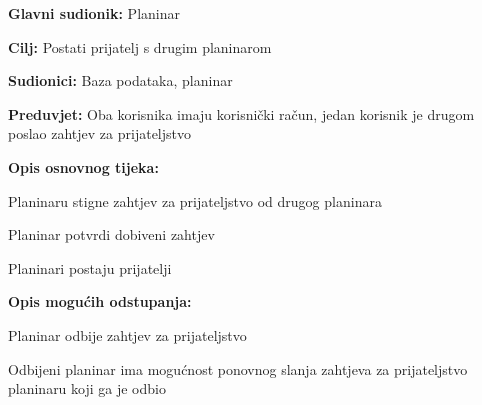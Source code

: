 		\noindent {}
		\begin{packed_item}
			
			\item \textbf{Glavni sudionik: }$ $Planinar$ $
			\item  \textbf{Cilj:} $ $Postati prijatelj s drugim planinarom$ $
			\item  \textbf{Sudionici:} $ $Baza podataka, planinar$ $
			\item  \textbf{Preduvjet:} $ $Oba korisnika imaju korisnički račun, jedan korisnik je drugom poslao zahtjev za prijateljstvo$ $
			\item  \textbf{Opis osnovnog tijeka:}
			
			\item[] \begin{packed_enum}
				
				\item $ $Planinaru stigne zahtjev za prijateljstvo od drugog planinara$ $
				\item $ $Planinar potvrdi dobiveni zahtjev$ $
				\item $ $Planinari postaju prijatelji$ $
				
			\end{packed_enum}
			
			\item  \textbf{Opis mogućih odstupanja:}
			
			\item[] \begin{packed_item}
				
				\item[2.a] $ $Planinar odbije zahtjev za prijateljstvo $ $
				\item[] \begin{packed_enum}
					
					\item $ $Odbijeni planinar ima mogućnost ponovnog slanja zahtjeva za prijateljstvo planinaru koji ga je odbio $ $
					
				\end{packed_enum}
			\end{packed_item}
		\end{packed_item}
	
